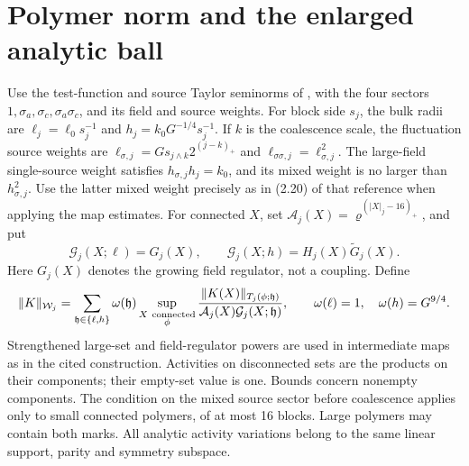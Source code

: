 \documentclass[11pt]{article}
\begin{document}
\section{Polymer norm and the enlarged analytic ball}\label{sec:contraction}
Use the test-function and source Taylor seminorms of
\cite[Sections 2.2--2.6]{ParkMap}, with the four sectors
\(1,\sigma_a,\sigma_c,\sigma_a\sigma_c\), and its field and source
weights. For block side \(s_j\), the bulk radii are
\(\ell_j=\ell_0s_j^{-1}\) and \(h_j=k_0G^{-1/4}s_j^{-1}\).
If \(k\) is the coalescence scale, the fluctuation source weights
are \(\ell_{\sigma,j}=G s_{j\wedge k}2^{(j-k)_+}\) and
\(\ell_{\sigma\sigma,j}=\ell_{\sigma,j}^2\).
The large-field single-source weight satisfies
\(h_{\sigma,j}h_j=k_0\), and its mixed weight is no larger than
\(h_{\sigma,j}^2\). Use the latter mixed weight precisely as in
(2.20) of that reference when applying the map estimates.
For connected \(X\), set
\(\mathcal A_j(X)=\varrho^{(|X|_j-16)_+}\), and put
\[
 \mathcal G_j(X;\ell)=G_j(X),\qquad
 \mathcal G_j(X;h)=H_j(X)\widetilde G_j(X).
\]
Here \(G_j(X)\) denotes the growing field regulator, not a coupling.
Define
\[
 \|K\|_{\mathcal W_j}
 =\sum_{\mathfrak h\in\{\ell,h\}}\omega(\mathfrak h)
  \sup_{\substack{X\ {
  \rm connected}\\\phi}}
  \frac{\|K(X)\|_{T_j(\phi;\mathfrak h)}}
       {\mathcal A_j(X)\mathcal G_j(X;\mathfrak h)},
 \qquad \omega(\ell)=1,\quad\omega(h)=G^{9/4}.
\]
Strengthened large-set and field-regulator powers are used in
intermediate maps as in the cited construction. Activities on
disconnected sets are the products on their components; their
empty-set value is one. Bounds concern nonempty components.
The condition on the mixed source sector before coalescence applies
only to small connected polymers, of at most 16 blocks. Large
polymers may contain both marks. All analytic activity variations
belong to the same linear support, parity and symmetry subspace.
\end{document}
